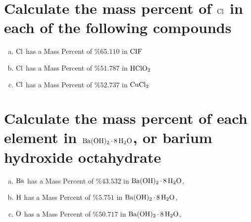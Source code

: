 \documentclass[11pt]{article}
\begin{document}
\section{Calculate the mass percent of \(\ce{Cl}\) in each of the following compounds}
\label{sec:org092fe0f}
\begin{enumerate}[(a)]
\item \(\ce{Cl}\)  has a Mass Percent of \%\(65.110\) in \(\ce{CIF}\)
\item \(\ce{Cl}\)  has a Mass Percent of \%\(51.787\) in \(\ce{HClO2}\)
\item \(\ce{Cl}\)  has a Mass Percent of \%\(52.737\) in \(\ce{CuCl2}\)
\end{enumerate}

\section{Calculate the mass percent of each element in \(\ce{Ba(OH)2*8H2O}\), or barium hydroxide octahydrate}
\label{sec:org2db4581}
\begin{enumerate}[(a)]
\item \(\ce{Ba}\)  has a Mass Percent of \%\(43.532\) in \(\ce{Ba(OH)2*8H2O}\),
\item \(\ce{H}\)  has a Mass Percent of \%\(5.751\) in \(\ce{Ba(OH)2*8H2O}\),
\item \(\ce{O}\)  has a Mass Percent of \%\(50.717\) in \(\ce{Ba(OH)2*8H2O}\),
\end{enumerate}
\end{document}
